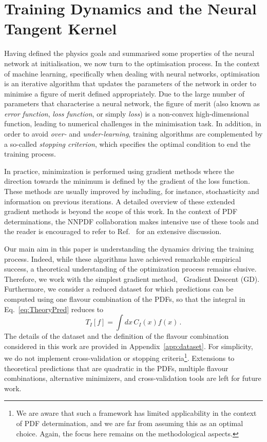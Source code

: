 \section{Training Dynamics and the Neural Tangent Kernel}
\label{sec:Training}

Having defined the physics goals and summarised some properties
of the neural network at initialisation, we now turn to the optimisation
process. In the context of machine learning, specifically when dealing with
neural networks, optimisation is an iterative algorithm that updates the
parameters of the network in order to minimise a figure of merit defined
appropriately. Due to the large number of parameters that characterise a neural
network, the figure of merit (also known as \textit{error function},
\textit{loss function}, or simply \textit{loss}) is a non-convex
high-dimensional function, leading to numerical challenges in the minimisation task. In
addition, in order to avoid \textit{over-} and \textit{under-learning}, 
training algorithms are complemented by a so-called \textit{stopping criterion},
which specifies the optimal condition to end the training process.

In practice, minimization is performed using gradient methods where the direction
towards the minimum is defined by the gradient of the loss function. These
methods are usually improved by including, for instance, stochasticity and
information on previous iterations. A detailed overview of these extended
gradient methods is beyond the scope of this work. In the context of PDF
determinations, the NNPDF collaboration makes intensive use of these tools and
the reader is encouraged to refer to Ref.~\cite{NNPDF:2021njg} for an extensive
discussion.

Our main aim in this paper is understanding the dynamics driving the training
process. Indeed, while these algorithms have achieved remarkable empirical
success, a theoretical understanding of the optimization process remains
elusive. Therefore, we work with the
simplest gradient method, \ie\ Gradient Descent (GD). Furthermore, we
consider a reduced dataset for which predictions can be computed using one flavour
combination of the PDFs, so that the integral in Eq.~\eqref{eq:TheoryPred}
reduces to
\begin{equation}
    \label{eq:TheoryPredSingleFlav}
    T_I[f] = \int dx\, C_{I}(x) f(x)\,.
\end{equation}
The details of the dataset and the definition of the flavour combination
considered in this work are provided in Appendix~\ref{app:dataset}.
For simplicity, we do not implement cross-validation or stopping
criteria\footnote{We are aware that such a framework has limited applicability
in the context of PDF determination, and we are far from assuming this as an
optimal choice. Again, the focus here remains on the methodological aspects.}. 
Extensions to theoretical predictions that are
quadratic in the PDFs, multiple flavour combinations, alternative minimizers,
and cross-validation tools are left for future work.

